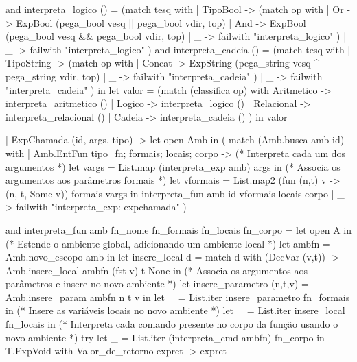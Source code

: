 \documentclass[12pt,a4paper,twoside]{article}
\begin{document}
\begin{terminal}
    and interpreta_logico () =
      (match tesq with
       | TipoBool ->
         (match op with
          | Or -> ExpBool (pega_bool vesq || pega_bool vdir, top)
          | And ->   ExpBool (pega_bool vesq && pega_bool vdir, top)
          | _ ->  failwith "interpreta_logico"
         )
       | _ ->  failwith "interpreta_logico"
      )
    and interpreta_cadeia () =
      (match tesq with
       | TipoString ->
         (match op with
          | Concat -> ExpString (pega_string vesq ^ pega_string vdir, top)
          | _ ->  failwith "interpreta_cadeia"
         )
       | _ ->  failwith "interpreta_cadeia"
      )
      in
    let valor = (match (classifica op) with
          Aritmetico -> interpreta_aritmetico ()
        | Logico -> interpreta_logico ()
        | Relacional -> interpreta_relacional ()
        | Cadeia -> interpreta_cadeia ()
      )
    in
      valor  


  | ExpChamada (id, args, tipo) ->
    let open Amb in
    ( match (Amb.busca amb id) with
      | Amb.EntFun {tipo_fn; formais; locais; corpo} ->
           (* Interpreta cada um dos argumentos *)
           let vargs = List.map (interpreta_exp amb) args in
           (* Associa os argumentos aos parâmetros formais *)
           let vformais = List.map2 (fun (n,t) v -> (n, t, Some v)) formais vargs
           in interpreta_fun amb id vformais locais corpo
      | _ -> failwith "interpreta_exp: expchamada"
    )

and interpreta_fun amb fn_nome fn_formais fn_locais fn_corpo =
  let open A in
 (* Estende o ambiente global, adicionando um ambiente local *)
  let ambfn = Amb.novo_escopo amb in
   let insere_local  d =
    match d with
      (DecVar (v,t)) -> Amb.insere_local ambfn (fst v)  t None
  in
  (* Associa os argumentos aos parâmetros e insere no novo ambiente *)
  let insere_parametro (n,t,v) = Amb.insere_param ambfn n t v in
  let _ = List.iter insere_parametro fn_formais in
  (* Insere as variáveis locais no novo ambiente *)
    let _ = List.iter insere_local fn_locais in
    (* Interpreta cada comando presente no corpo da função usando o novo
       ambiente *)
  try
    let _ = List.iter (interpreta_cmd ambfn) fn_corpo in T.ExpVoid
    with
       Valor_de_retorno expret -> expret


\end{terminal}
\end{document}
